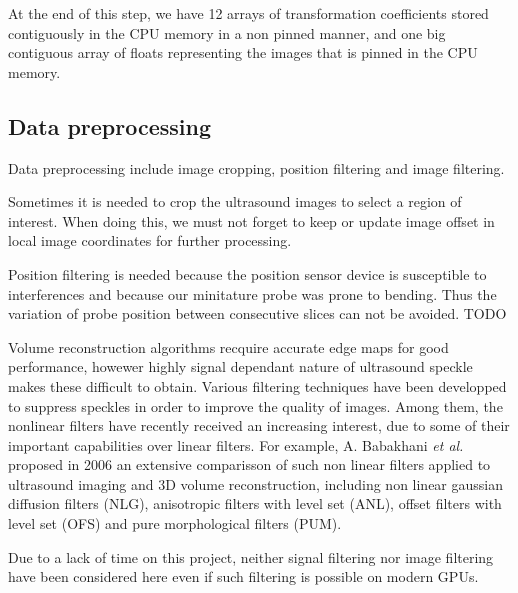\documentclass[12pt,journal,compsoc]{IEEEtran}
\begin{document}
At the end of this step, we have 12 arrays of transformation coefficients stored contiguously in the CPU memory in a non pinned manner, and one big contiguous array of floats representing the images that is pinned in the CPU memory. 

\subsection{Data preprocessing}


Data preprocessing include image cropping, position filtering and image filtering.\par

Sometimes it is needed to crop the ultrasound images to select a region of interest. When doing this, we must not forget to keep or update image offset in local image coordinates for further processing. 

Position filtering is needed because the position sensor device is susceptible to interferences and because our minitature probe was prone to bending. Thus the variation of probe position between consecutive slices can not be avoided. TODO\par

Volume reconstruction algorithms recquire accurate edge maps for good performance, howewer highly signal dependant nature of ultrasound speckle makes these difficult to obtain. Various filtering techniques have been developped to suppress speckles in order to improve the quality of images. 
Among them, the nonlinear filters have recently received an increasing interest, due to some of their important capabilities over linear filters. For example, A. Babakhani \textit{et al.}\cite{1} proposed in 2006 an extensive comparisson of such non linear filters applied to ultrasound imaging and 3D volume reconstruction, including non linear gaussian diffusion filters (NLG), anisotropic filters with level set (ANL), offset filters with level set (OFS) and pure morphological filters (PUM).\par

Due to a lack of time on this project, neither signal filtering nor image filtering have been considered here even if such filtering is possible on modern GPUs.
\end{document}
